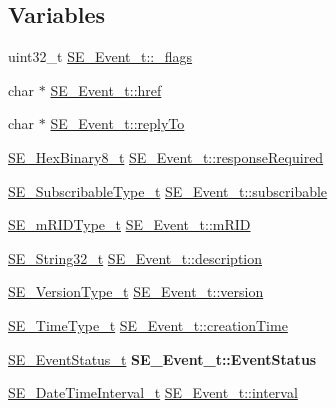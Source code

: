 \subsection*{Variables}
\begin{DoxyCompactItemize}
\item 
uint32\+\_\+t \hyperlink{group__Event_gac9829e2ed56cc6d533951c5829a06447}{S\+E\+\_\+\+Event\+\_\+t\+::\+\_\+flags}
\item 
char $\ast$ \hyperlink{group__Event_gab778833a8a3a8f65c71ed89d477ffd26}{S\+E\+\_\+\+Event\+\_\+t\+::href}
\item 
char $\ast$ \hyperlink{group__Event_ga6e7f7661e18f5488e25401be9e7ee189}{S\+E\+\_\+\+Event\+\_\+t\+::reply\+To}
\item 
\hyperlink{group__HexBinary8_gaecf2dab3615fb954a693c017a61f77d6}{S\+E\+\_\+\+Hex\+Binary8\+\_\+t} \hyperlink{group__Event_ga78cfb38c0c12b9e22a7bc22493dfc841}{S\+E\+\_\+\+Event\+\_\+t\+::response\+Required}
\item 
\hyperlink{group__SubscribableType_ga5c41f553d369710ed34619266bf2551e}{S\+E\+\_\+\+Subscribable\+Type\+\_\+t} \hyperlink{group__Event_ga39e93713a0f72e98d013681430dbea2b}{S\+E\+\_\+\+Event\+\_\+t\+::subscribable}
\item 
\hyperlink{group__mRIDType_gac74622112f3a388a2851b2289963ba5e}{S\+E\+\_\+m\+R\+I\+D\+Type\+\_\+t} \hyperlink{group__Event_ga6985465bb16ad66b47d319bbce654b5c}{S\+E\+\_\+\+Event\+\_\+t\+::m\+R\+ID}
\item 
\hyperlink{group__String32_gac9f59b06b168b4d2e0d45ed41699af42}{S\+E\+\_\+\+String32\+\_\+t} \hyperlink{group__Event_gae4f20895ab9cd471d8b83c6a44f936fe}{S\+E\+\_\+\+Event\+\_\+t\+::description}
\item 
\hyperlink{group__VersionType_ga4b8d27838226948397ed99f67d46e2ae}{S\+E\+\_\+\+Version\+Type\+\_\+t} \hyperlink{group__Event_ga2e534e84cddb42f9ac5e30cac9852117}{S\+E\+\_\+\+Event\+\_\+t\+::version}
\item 
\hyperlink{group__TimeType_ga6fba87a5b57829b4ff3f0e7638156682}{S\+E\+\_\+\+Time\+Type\+\_\+t} \hyperlink{group__Event_gaf230dbf11dcdc46c1f94be114028033f}{S\+E\+\_\+\+Event\+\_\+t\+::creation\+Time}
\item 
\mbox{\label{group__Event_gac0e75aa423cc1fde371fc17e76bdcb25}} 
\hyperlink{structSE__EventStatus__t}{S\+E\+\_\+\+Event\+Status\+\_\+t} {\bfseries S\+E\+\_\+\+Event\+\_\+t\+::\+Event\+Status}
\item 
\hyperlink{structSE__DateTimeInterval__t}{S\+E\+\_\+\+Date\+Time\+Interval\+\_\+t} \hyperlink{group__Event_gaeaa7db57ff123c151dba417d4d60ec42}{S\+E\+\_\+\+Event\+\_\+t\+::interval}
\end{DoxyCompactItemize}


